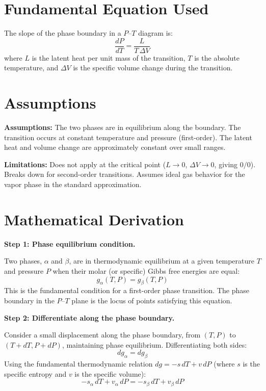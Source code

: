 \documentclass[11pt,openright]{book}
\begin{document}
\section*{Fundamental Equation Used}

The slope of the phase boundary in a $P$--$T$ diagram is:
\[
\frac{dP}{dT} = \frac{L}{T\,\Delta V}
\]
where $L$ is the latent heat per unit mass of the transition, $T$ is the absolute temperature, and $\Delta V$ is the specific volume change during the transition.
\section*{Assumptions}

\textbf{Assumptions:} The two phases are in equilibrium along the boundary. The transition occurs at constant temperature and pressure (first-order). The latent heat and volume change are approximately constant over small ranges.


\textbf{Limitations:} Does not apply at the critical point ($L \to 0$, $\Delta V \to 0$, giving $0/0$). Breaks down for second-order transitions. Assumes ideal gas behavior for the vapor phase in the standard approximation.


\section*{Mathematical Derivation}

\textbf{Step 1: Phase equilibrium condition.}

Two phases, $\alpha$ and $\beta$, are in thermodynamic equilibrium at a given temperature $T$ and pressure $P$ when their molar (or specific) Gibbs free energies are equal:
\begin{equation}
g_\alpha(T, P) = g_\beta(T, P)
\end{equation}
This is the fundamental condition for a first-order phase transition. The phase boundary in the $P$--$T$ plane is the locus of points satisfying this equation.

\textbf{Step 2: Differentiate along the phase boundary.}

Consider a small displacement along the phase boundary, from $(T, P)$ to $(T + dT, P + dP)$, maintaining phase equilibrium. Differentiating both sides:
\begin{equation}
dg_\alpha = dg_\beta
\end{equation}
Using the fundamental thermodynamic relation $dg = -s\,dT + v\,dP$ (where $s$ is the specific entropy and $v$ is the specific volume):
\begin{equation}
-s_\alpha\,dT + v_\alpha\,dP = -s_\beta\,dT + v_\beta\,dP
\end{equation}
\end{document}
